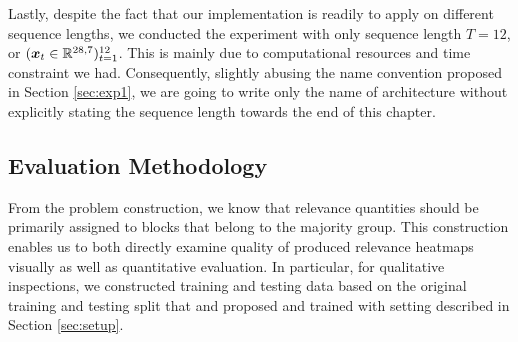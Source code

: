 
\begin{figure}[!htb]
\centering

     \hfill

\label{fig:deep_conv_arch}
\end{figure}

Lastly, despite the fact that  our implementation is readily to apply on different sequence lengths,  we conducted the experiment with only sequence length $T=12$, or $(\boldsymbol{x}_t \in \mathbb{R}^{28,7})_{t=1}^{12}$. This is mainly due to computational resources and time constraint we had. Consequently, slightly abusing the name convention proposed in Section \ref{sec:exp1}, we are going to write only the name of architecture without explicitly stating the sequence length towards the end of this chapter.


\subsection{Evaluation Methodology}
\label{sec:evaluation_med}
From the problem construction, we know that relevance quantities should  be primarily assigned to blocks that belong to the majority group. This construction enables us to both directly examine quality of produced relevance heatmaps visually as well as quantitative evaluation.  In particular, for qualitative inspections, we constructed training and testing data based on the original training and testing split that \cite{LeCunMNISThandwrittendigit2010} and \cite{XiaoFashionMNISTNovelImage2017} proposed and trained with setting described in Section \ref{sec:setup}. 

